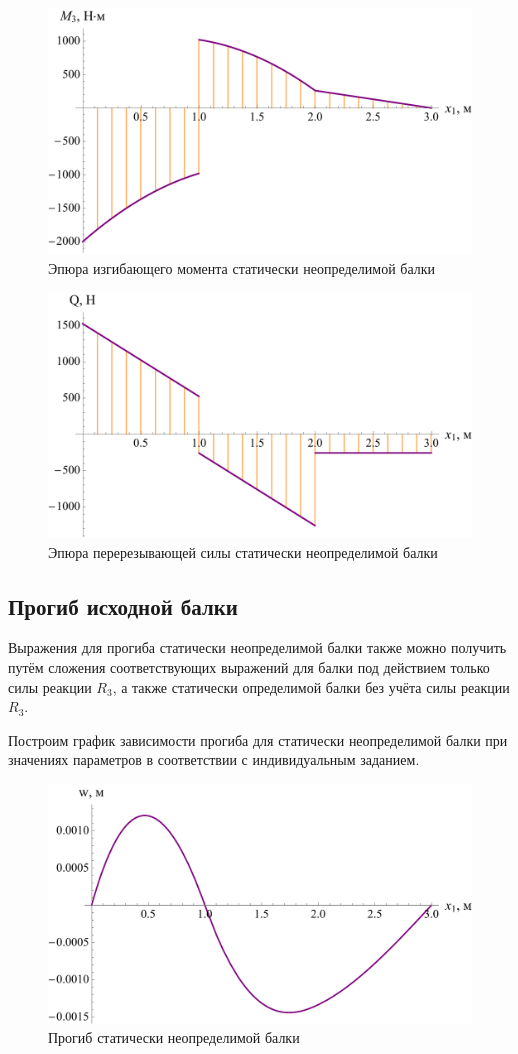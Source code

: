 \documentclass[12pt, a4paper]{article}
\begin{document}
	\newpage
	
	\begin{figure}[!h]
		\centering
		\includegraphics[width=0.75\linewidth]{plot-10}
		\caption{Эпюра изгибающего момента статически неопределимой балки}
	\end{figure} 
	
	\begin{figure}[!h]
		\centering
		\includegraphics[width=0.75\linewidth]{plot-11}
		\caption{Эпюра перерезывающей силы статически неопределимой балки}
	\end{figure}
	
	\subsection{Прогиб исходной балки}
	
	Выражения для прогиба статически неопределимой балки также можно получить путём сложения соответствующих выражений для балки под действием только силы реакции $R_3$, а также статически определимой балки без учёта силы реакции $R_3$. 
	
	Построим график зависимости прогиба для статически неопределимой балки при значениях параметров в соответствии с индивидуальным заданием.
	
	\begin{figure}[!h]
		\centering
		\includegraphics[width=0.75\linewidth]{plot-12}
		\caption{Прогиб статически неопределимой балки}
	\end{figure}
	
\end{document}
